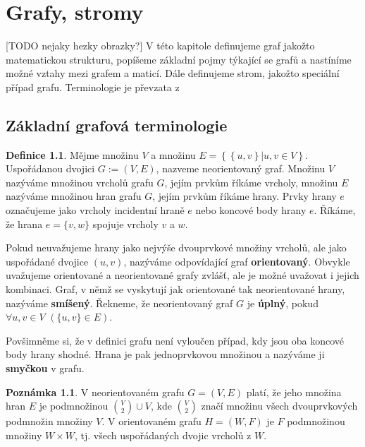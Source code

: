 \documentclass[11pt,american,czech,oneside]{book}
\theoremstyle{plain}
\theoremstyle{definition}
\newtheorem{definition}{Definice}
\newtheorem{remark}{Poznámka}
\begin{document}
\chapter{Grafy, stromy} [TODO nejaky hezky obrazky?] 
V této kapitole definujeme graf jakožto matematickou strukturu, popíšeme základní pojmy týkající se grafů a nastíníme možné vztahy mezi grafem a maticí. Dále definujeme strom, jakožto speciální případ grafu. Terminologie je převzata z \cite{koub:11}

\section{Základní grafová terminologie}

\begin{definition}
  Mějme množinu $V$ a množinu $E = \left\{ \left\{ u,v \right\} | u,v \in V \right\}$. Uspořádanou dvojici $G := (V,E)$, nazveme neorientovaný graf. Množinu $V$ nazýváme množinou vrcholů grafu $G$, jejím prvkům říkáme vrcholy, množinu $E$ nazýváme množinou hran grafu $G$, jejím prvkům říkáme hrany. Prvky hrany $e$ označujeme jako vrcholy incidentní hraně $e$ nebo koncové body hrany $e$. Říkáme, že hrana $e = \{v,w\}$ spojuje vrcholy $v$ a $w$.
\end{definition}

Pokud neuvažujeme hrany jako nejvýše dvouprvkové množiny vrcholů, ale  jako uspořádané dvojice $(u,v)$, nazýváme odpovídající graf \textbf{orientovaný}. Obvykle uvažujeme orientované a neorientované grafy zvlášť, ale je možné uvažovat i jejich kombinaci. Graf, v němž se vyskytují jak orientované tak neorientované hrany, nazýváme \textbf{smíšený}. Řekneme, že neorientovaný graf $G$ je \textbf{úplný}, pokud $\forall u, v \in V$ $\left(\{u,v\} \in E\right)$.

Povšimněme si, že v definici grafu není vyloučen případ, kdy jsou oba koncové body hrany shodné. Hrana je pak jednoprvkovou množinou a nazýváme ji \textbf{smyčkou} v grafu.

\begin{remark}
  V neorientovaném grafu $G=(V,E)$ platí, že jeho množina hran $E$ je podmnožinou ${V \choose 2} \cup V$, kde $V \choose 2$ značí množinu všech dvouprvkových podmnožin množiny $V$. V orientovaném grafu $H=(W,F)$ je $F$ podmnožinou množiny $W \times W$, tj. všech uspořádaných dvojic vrcholů z $W$.
\end{remark}
\end{document}
